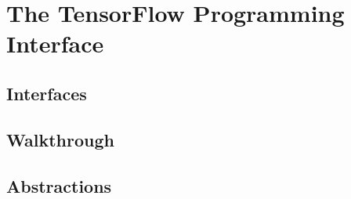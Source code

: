 \section{The TensorFlow Programming Interface}\label{sec:code}

\subsection{Interfaces}\label{sec:code-interfaces}

\subsection{Walkthrough}\label{sec:code-walk}

\subsection{Abstractions}\label{sec:code-abstract}

